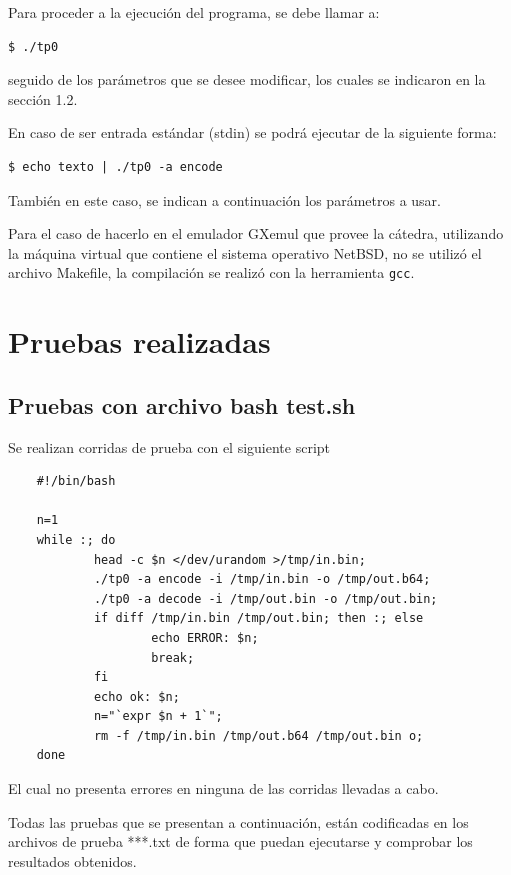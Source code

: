 \documentclass[10pt,a4paper]{article}
\begin{document}
Para proceder a la ejecución del programa, se debe llamar a:

\begin{lstlisting}
$ ./tp0
\end{lstlisting}

seguido de los parámetros que se desee modificar, los cuales se indicaron en la sección 1.2.

En caso de ser entrada estándar (stdin) se podrá ejecutar de la siguiente forma:

\begin{lstlisting}
$ echo texto | ./tp0 -a encode
\end{lstlisting}

También en este caso, se indican a continuación los parámetros a usar.

Para el caso de hacerlo en el emulador GXemul que provee la cátedra, utilizando la máquina virtual que contiene el sistema operativo NetBSD, no se utilizó el archivo Makefile, la compilación se realizó con la herramienta \texttt{gcc}.
\newpage


\section{Pruebas realizadas}

\subsection{Pruebas con archivo bash test.sh}
Se realizan corridas de prueba con el siguiente script

\begin{lstlisting}
    #!/bin/bash

    n=1
    while :; do
            head -c $n </dev/urandom >/tmp/in.bin;
            ./tp0 -a encode -i /tmp/in.bin -o /tmp/out.b64;
            ./tp0 -a decode -i /tmp/out.bin -o /tmp/out.bin;
            if diff /tmp/in.bin /tmp/out.bin; then :; else
                    echo ERROR: $n;
                    break;
            fi
            echo ok: $n;
            n="`expr $n + 1`";
            rm -f /tmp/in.bin /tmp/out.b64 /tmp/out.bin o;
    done

\end{lstlisting}

El cual no presenta errores en ninguna de las corridas llevadas a cabo.


Todas las pruebas que se presentan a continuación, están codificadas en los archivos de prueba ***.txt de forma que puedan ejecutarse y comprobar los resultados obtenidos.
\end{document}
